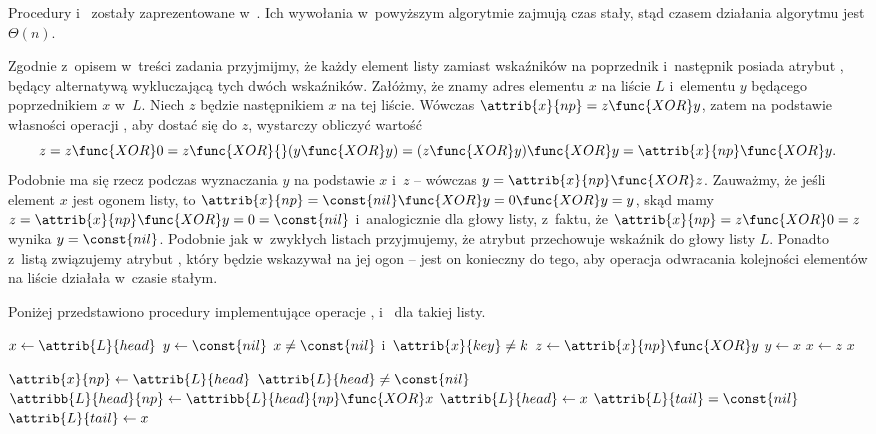 Procedury  i~ zostały zaprezentowane w~.
Ich wywołania w~powyższym algorytmie zajmują czas stały, stąd czasem działania algorytmu jest $\Theta(n)$.

\exercise %
Zgodnie z~opisem w~treści zadania przyjmijmy, że każdy element listy zamiast wskaźników na poprzednik i~następnik posiada atrybut , będący alternatywą wykluczającą tych dwóch wskaźników.
Załóżmy, że znamy adres elementu $x$ na liście $L$ i~elementu $y$ będącego poprzednikiem $x$ w~$L$.
Niech $z$ będzie następnikiem $x$ na tej liście.
Wówczas $\attrib{x}{np}=z\func{XOR}y$, zatem na podstawie własności operacji , aby dostać się do $z$, wystarczy obliczyć wartość
\[
    z = z\func{XOR}0 = z\func{XOR}{}(y\func{XOR}y) = (z\func{XOR}y)\func{XOR}y = \attrib{x}{np}\func{XOR}y.
\]
Podobnie ma się rzecz podczas wyznaczania $y$ na podstawie $x$ i~$z$ -- wówczas $y=\attrib{x}{np}\func{XOR}z$.
Zauważmy, że jeśli element $x$ jest ogonem listy, to $\attrib{x}{np}=\const{nil}\func{XOR}y=0\func{XOR}y=y$, skąd mamy $z=\attrib{x}{np}\func{XOR}y=0=\const{nil}$ i~analogicznie dla głowy listy, z~faktu, że $\attrib{x}{np}=z\func{XOR}0=z$ wynika $y=\const{nil}$.
Podobnie jak w~zwykłych listach przyjmujemy, że atrybut  przechowuje wskaźnik do głowy listy $L$.
Ponadto z~listą związujemy atrybut , który będzie wskazywał na jej ogon -- jest on konieczny do tego, aby operacja odwracania kolejności elementów na liście działała w~czasie stałym.

Poniżej przedstawiono procedury implementujące operacje ,  i~ dla takiej listy.
\begin{codebox}
\li	$x\gets\attrib{L}{head}$
\li	$y\gets\const{nil}$
\li	\While $x\ne\const{nil}$ i~$\attrib{x}{key}\ne k$
\li		\Do $z\gets\attrib{x}{np}\func{XOR}y$
\li			$y\gets x$
\li			$x\gets z$
		\End
\li	\Return $x$
\end{codebox}

\begin{codebox}
\li	$\attrib{x}{np}\gets\attrib{L}{head}$
\li	\If $\attrib{L}{head}\ne\const{nil}$
\li		\Then $\attribb{L}{head}{np}\gets\attribb{L}{head}{np}\func{XOR}x$
		\End
\li	$\attrib{L}{head}\gets x$
\li	\If $\attrib{L}{tail}=\const{nil}$
\li		\Then $\attrib{L}{tail}\gets x$
		\End
\end{codebox}

